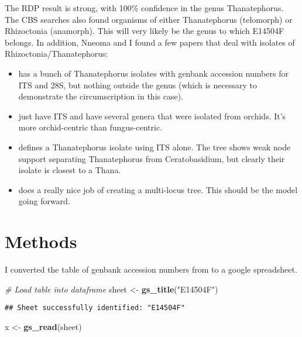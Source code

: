 \documentclass[11pt,]{article}
\newenvironment{Shaded}{\begin{snugshade}}{\end{snugshade}}
\newcommand{\KeywordTok}[1]{\textcolor[rgb]{0.13,0.29,0.53}{\textbf{{#1}}}}
\newcommand{\StringTok}[1]{\textcolor[rgb]{0.31,0.60,0.02}{{#1}}}
\newcommand{\CommentTok}[1]{\textcolor[rgb]{0.56,0.35,0.01}{\textit{{#1}}}}
\newcommand{\NormalTok}[1]{{#1}}
\providecommand{\tightlist}{%
  \setlength{\itemsep}{0pt}\setlength{\parskip}{0pt}}
\begin{document}
The RDP result is strong, with 100\% confidence in the genus
Thanatephorus. The CBS searches also found organisms of either
Thanatephorus (telomorph) or Rhizoctonia (anamorph). This will very
likely be the genus to which E14504F belongs. In addition, Nneoma and I
found a few papers that deal with isolates of Rhizoctonia/Thanatephorus:

\begin{itemize}
\tightlist
\item
  \citep{gonzalez_ribosomal_2001} has a bunch of Thanatephorus isolates
  with genbank accession numbers for ITS and 28S, but nothing outside
  the genus (which is necessary to demonstrate the circumscription in
  this case).
\item
  \citep{tupac_otero_diversity_2002} just have ITS and have several
  genera that were isolated from orchids. It's more orchid-centric than
  fungus-centric.
\item
  \citep{lopez-chavez_proteomic_2016} defines a Thanatephorus isolate
  using ITS alone. The tree shows weak node support separating
  Thanatephorus from Ceratobasidium, but clearly their isolate is
  closest to a Thana.
\item
  \citep{gonzalez_phylogenetic_2016} does a really nice job of creating
  a multi-locus tree. This should be the model going forward.
\end{itemize}

\section{Methods}\label{methods}

I converted the table of genbank accession numbers from
\citep{gonzalez_phylogenetic_2016} to a google spreadsheet.

\begin{Shaded}
\begin{Highlighting}[]
\CommentTok{# Load table into dataframe}
\NormalTok{sheet <-}\StringTok{ }\KeywordTok{gs_title}\NormalTok{(}\StringTok{"E14504F"}\NormalTok{)}
\end{Highlighting}
\end{Shaded}

\begin{verbatim}
## Sheet successfully identified: "E14504F"
\end{verbatim}

\begin{Shaded}
\begin{Highlighting}[]
\NormalTok{x <-}\StringTok{ }\KeywordTok{gs_read}\NormalTok{(sheet)}
\end{Highlighting}
\end{Shaded}
\end{document}
